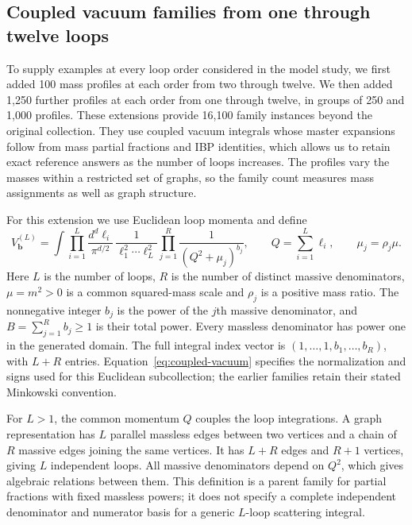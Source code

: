\subsection{Coupled vacuum families from one through twelve loops}
\label{sec:higher-loop-generation}
To supply examples at every loop order considered in the model study,
we first added 100 mass profiles at each order from two through twelve.
We then added 1,250 further profiles at each order from one through twelve,
in groups of 250 and 1,000 profiles. These extensions provide
16,100 family instances beyond the original collection. They use
coupled vacuum integrals whose master expansions follow from mass
partial fractions and IBP identities, which allows us to retain exact
reference answers as the number of loops increases. The profiles vary
the masses within a restricted set of graphs, so the family count
measures mass assignments as well as graph structure.

For this extension we use Euclidean loop momenta and define
\begin{equation}
 V^{(L)}_{\boldsymbol b}=
 \int\prod_{i=1}^{L}\frac{d^d\ell_i}{\pi^{d/2}}\,
 \frac{1}{\ell_1^2\cdots\ell_L^2}
 \prod_{j=1}^{R}\frac{1}{(Q^2+\mu_j)^{b_j}},
 \qquad
 Q=\sum_{i=1}^{L}\ell_i,\qquad \mu_j=\rho_j\mu .
 \label{eq:coupled-vacuum}
\end{equation}
Here $L$ is the number of loops, $R$ is the number of distinct massive
denominators, $\mu=m^2>0$ is a common squared-mass scale and
$\rho_j$ is a positive mass ratio. The nonnegative integer $b_j$
is the power of the $j$th massive denominator, and
$B=\sum_{j=1}^{R}b_j\geq1$ is their total power. Every massless
denominator has power one in the generated domain. The full integral
index vector is $(1,\ldots,1,b_1,\ldots,b_R)$, with $L+R$ entries.
Equation~\eqref{eq:coupled-vacuum} specifies the normalization and signs
used for this Euclidean subcollection; the earlier families retain
their stated Minkowski convention.

For $L>1$, the common momentum $Q$ couples the loop integrations. A graph
representation has $L$ parallel massless edges between two vertices
and a chain of $R$ massive edges joining the same vertices. It has
$L+R$ edges and $R+1$ vertices, giving $L$ independent loops.
All massive denominators depend on $Q^2$, which gives algebraic
relations between them. This definition is a parent family for partial
fractions with fixed massless powers; it does not specify a complete
independent denominator and numerator basis for a generic
$L$-loop scattering integral.

